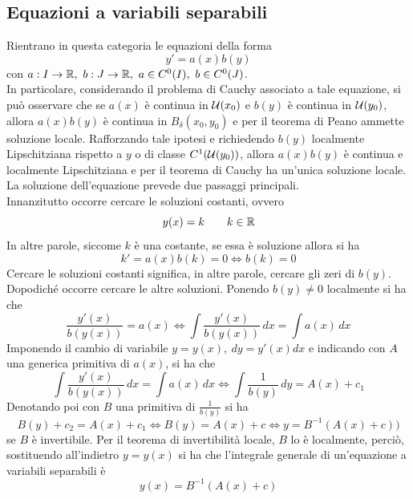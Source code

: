 \subsection{Equazioni a variabili separabili}
Rientrano in questa categoria le equazioni della forma
\begin{equation} \label{Eq: Equazione a variabili separabili}
    y'=a(x)b(y) 
\end{equation}
con $a:I \to \mathbb{R},\ b: J \to \mathbb{R},\ a \in C^0(I),\ b \in C^0(J)$.\\
In particolare, considerando il problema di Cauchy associato a tale equazione, si può osservare che se $a(x)$ è continua in $\mathcal{U}(x_0)$ e $b(y)$ è continua in $\mathcal{U}(y_0)$, allora $a(x)b(y)$ è continua in $B_\delta(x_0, y_0)$ e per il teorema di Peano ammette soluzione locale. Rafforzando tale ipotesi e richiedendo $b(y)$ localmente Lipschitziana rispetto a $y$ o di classe $C^1(\mathcal{U}(y_0))$, allora $a(x)b(y)$ è continua e localmente Lipschitziana e per il teorema di Cauchy ha un'unica soluzione locale.\\
La soluzione dell'equazione prevede due passaggi principali.\\
Innanzitutto occorre cercare le soluzioni costanti, ovvero
\begin{equation}
    y(x)=k \qquad k \in \mathbb{R}
\end{equation}
In altre parole, siccome $k$ è una costante, se essa è soluzione allora si ha 
\begin{equation}
    k' = a(x)b(k) = 0 \iff b(k)=0
\end{equation}
Cercare le soluzioni costanti significa, in altre parole, cercare gli zeri di $b(y)$.\\
Dopodiché occorre cercare le altre soluzioni. Ponendo $b(y) \neq 0$ localmente si ha che
\begin{equation}
    \frac{y'(x)}{b(y(x))}=a(x) \iff \int{\frac{y'(x)}{b(y(x))}}\, dx=\int{a(x)}\, dx 
\end{equation}
Imponendo il cambio di variabile $y=y(x),\ dy=y'(x)dx$ e indicando con $A$ una generica primitiva di $a(x)$, si ha che
\begin{equation}
    \int{\frac{y'(x)}{b(y(x))}}\, dx=\int{a(x)}\, dx \iff \int{\frac{1}{b(y)}}\,dy=A(x)+c_1
\end{equation}
Denotando poi con $B$ una primitiva di $\tfrac{1}{b(y)}$ si ha
\begin{equation}
    B(y)+c_2=A(x)+c_1 \iff B(y)=A(x)+c \iff y=B^{-1}(A(x)+c))
\end{equation}
se $B$ è invertibile. Per il teorema di invertibilità locale, $B$ lo è localmente, perciò, sostituendo all'indietro $y=y(x)$ si ha che l'integrale generale di un'equazione a variabili separabili è
\begin{equation} 
    y(x)=B^{-1}(A(x)+c)
\end{equation}
